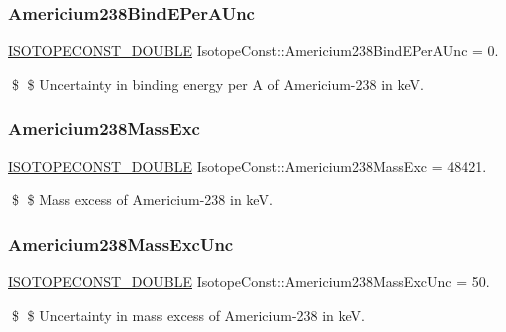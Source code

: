 \subsubsection{\texorpdfstring{Americium238\+Bind\+E\+Per\+A\+Unc}{Americium238BindEPerAUnc}}
{\footnotesize\ttfamily \mbox{\hyperlink{group___isotope_const-_macros_ga8f45a7272ce02c0b4c65c44636ed719a}{I\+S\+O\+T\+O\+P\+E\+C\+O\+N\+S\+T\+\_\+\+D\+O\+U\+B\+LE}} Isotope\+Const\+::\+Americium238\+Bind\+E\+Per\+A\+Unc = 0.}

\$ \$ Uncertainty in binding energy per A of Americium-\/238 in keV. \mbox{\label{group___isotope_const-_americium-_am238_ga63723c4fe666709ea28e31e04482a9e4}} 
\subsubsection{\texorpdfstring{Americium238\+Mass\+Exc}{Americium238MassExc}}
{\footnotesize\ttfamily \mbox{\hyperlink{group___isotope_const-_macros_ga8f45a7272ce02c0b4c65c44636ed719a}{I\+S\+O\+T\+O\+P\+E\+C\+O\+N\+S\+T\+\_\+\+D\+O\+U\+B\+LE}} Isotope\+Const\+::\+Americium238\+Mass\+Exc = 48421.}

\$ \$ Mass excess of Americium-\/238 in keV. \mbox{\label{group___isotope_const-_americium-_am238_gafe53cd3d992824c4e73017e701cb3ac7}} 
\subsubsection{\texorpdfstring{Americium238\+Mass\+Exc\+Unc}{Americium238MassExcUnc}}
{\footnotesize\ttfamily \mbox{\hyperlink{group___isotope_const-_macros_ga8f45a7272ce02c0b4c65c44636ed719a}{I\+S\+O\+T\+O\+P\+E\+C\+O\+N\+S\+T\+\_\+\+D\+O\+U\+B\+LE}} Isotope\+Const\+::\+Americium238\+Mass\+Exc\+Unc = 50.}

\$ \$ Uncertainty in mass excess of Americium-\/238 in keV. \mbox{\label{group___isotope_const-_americium-_am238_gaca530676eab99aee4e47d8e9b5197b26}} 
